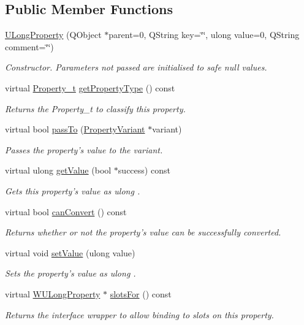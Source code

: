 \subsection*{Public Member Functions}
\begin{DoxyCompactItemize}
\item 
\hyperlink{class_u_long_property_ac844158e013ca84c63b7bb434aa4ed4b}{U\-Long\-Property} (Q\-Object $\ast$parent=0, Q\-String key=\char`\"{}\char`\"{}, ulong value=0, Q\-String comment=\char`\"{}\char`\"{})
\begin{DoxyCompactList}\small\item\em Constructor. Parameters not passed are initialised to safe null values. \end{DoxyCompactList}\item 
virtual \hyperlink{group___property_classes_ga38f1ccddda12c7cb50b868c9f789ee37}{Property\-\_\-t} \hyperlink{class_u_long_property_aab8927e988f483d6334ba1ccffeeda99}{get\-Property\-Type} () const 
\begin{DoxyCompactList}\small\item\em Returns the Property\-\_\-t to classify this property. \end{DoxyCompactList}\item 
virtual bool \hyperlink{class_u_long_property_a08f952e4db14c65d472d4961dab9ac0c}{pass\-To} (\hyperlink{class_property_variant}{Property\-Variant} $\ast$variant)
\begin{DoxyCompactList}\small\item\em Passes the property's value to the variant. \end{DoxyCompactList}\item 
virtual ulong \hyperlink{class_u_long_property_a2d0ab1518fe88b2201b98dd5adf7f0a2}{get\-Value} (bool $\ast$success) const 
\begin{DoxyCompactList}\small\item\em Gets this property's value as ulong . \end{DoxyCompactList}\item 
virtual bool \hyperlink{class_u_long_property_a1ceb817d2b4fad531e3a893ad1b33273}{can\-Convert} () const 
\begin{DoxyCompactList}\small\item\em Returns whether or not the property's value can be successfully converted. \end{DoxyCompactList}\item 
virtual void \hyperlink{class_u_long_property_ac52a81a11a65723ab008ba066be522f3}{set\-Value} (ulong value)
\begin{DoxyCompactList}\small\item\em Sets the property's value as ulong . \end{DoxyCompactList}\item 
virtual \hyperlink{class_w_u_long_property}{W\-U\-Long\-Property} $\ast$ \hyperlink{class_u_long_property_a9c7a625deeba3f906ae2cb415a9eddfb}{slots\-For} () const 
\begin{DoxyCompactList}\small\item\em Returns the interface wrapper to allow binding to slots on this property. \end{DoxyCompactList}\end{DoxyCompactItemize}
